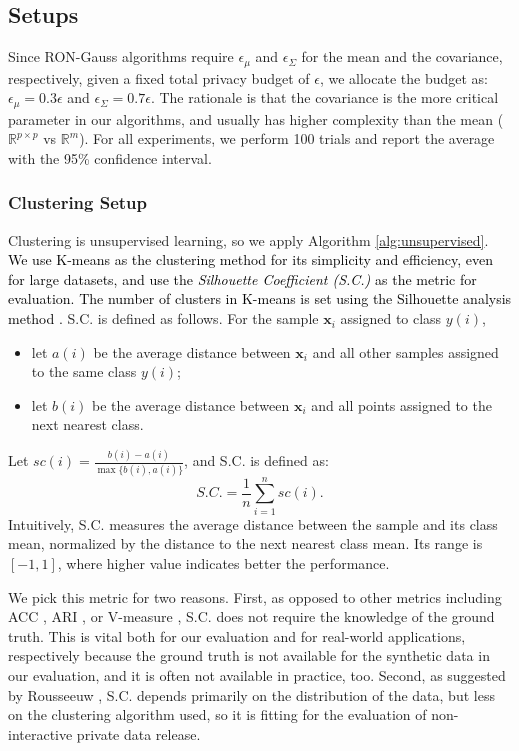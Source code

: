 \documentclass[USenglish,oneside,twocolumn]{article}
\theoremstyle{definition}
\theoremstyle{remark}
\theoremstyle{plain}
\theoremstyle{plain}
\newcommand{\chang}{\textcolor{black}}
\begin{document}
\vspace{-1em}
\subsection{Setups \label{subsec:Setups}}

Since RON-Gauss algorithms require $\epsilon_{\mu}$ and $\epsilon_{\Sigma}$
for the mean and the covariance, respectively, given a fixed total
privacy budget of $\epsilon$, we allocate the budget as:
$\epsilon_{\mu}=0.3\epsilon$ and $\epsilon_{\Sigma}=0.7\epsilon$.
The rationale is that the covariance is the more critical
parameter in our algorithms, and usually has higher complexity than
the mean ($\mathbb{R}^{p\times p}$ vs $\mathbb{R}^{m}$). For all
experiments, we perform 100 trials and report the average with
the 95\% confidence interval.

\vspace{-1.3em}
\subsubsection{Clustering Setup}
\vspace{-1em}
Clustering is unsupervised learning, so we apply Algorithm
\ref{alg:unsupervised}. \chang{We use K-means \cite{RefWorks:33}
as the clustering method for its simplicity and efficiency, even for large datasets, and use the \emph{Silhouette Coefficient
(S.C.)} \cite{RefWorks:232} as the metric for evaluation. The number of clusters in K-means is set using the Silhouette analysis method \cite{RefWorks:232,silhouette_analysis}.} S.C. is defined as follows. For the sample
$\mathbf{x}_{i}$ assigned to class $y(i)$, 
\begin{itemize}
\item let $a(i)$ be the average distance between $\mathbf{x}_{i}$ and
all other samples assigned to the same class $y(i)$; 
\item let $b(i)$ be the average distance between $\mathbf{x}_{i}$ and
all points assigned to the next nearest class.
\end{itemize}
\vspace{-0.5em}
Let $sc(i)=\frac{b(i)-a(i)}{\max\{b(i),a(i)\}}$, and S.C. is defined
as: 
\[
S.C.=\frac{1}{n}\sum_{i=1}^{n}sc(i).
\]
Intuitively, S.C. measures the average distance between the sample
and its class mean, normalized by the distance to the next nearest
class mean. Its range is $[-1,1]$, where higher value indicates
better the performance.

We pick this metric for two reasons. First, as opposed to other
metrics including ACC \cite{RefWorks:373}, ARI \cite{RefWorks:374},
or V-measure \cite{RefWorks:375}, S.C. does not require the knowledge
of the ground truth. This is vital both for our evaluation and for
real-world applications, respectively because the ground truth is
not available for the synthetic data in our evaluation, and it is
often not available in practice, too. Second, as suggested by Rousseeuw
\cite{RefWorks:232}, S.C. depends primarily on the distribution of
the data, but less on the clustering algorithm used, so it is fitting
for the evaluation of non-interactive private data release.
\end{document}

